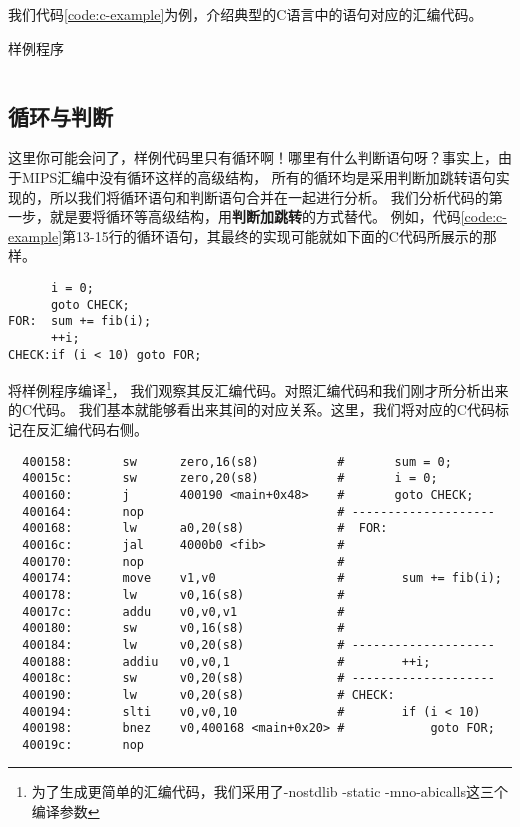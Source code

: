 我们代码\ref{code:c-example}为例，介绍典型的C语言中的语句对应的汇编代码。

\begin{codeBoxWithCaption}{样例程序\label{code:c-example}}
  \inputminted[linenos]{c}{codes/example.c}
\end{codeBoxWithCaption}

\subsection{循环与判断}
这里你可能会问了，样例代码里只有循环啊！哪里有什么判断语句呀？事实上，由于MIPS汇编中没有循环这样的高级结构，
所有的循环均是采用判断加跳转语句实现的，所以我们将循环语句和判断语句合并在一起进行分析。
我们分析代码的第一步，就是要将循环等高级结构，用\textbf{判断加跳转}的方式替代。
例如，代码\ref{code:c-example}第13-15行的循环语句，其最终的实现可能就如下面的C代码所展示的那样。

\begin{verbatim}
      i = 0;
      goto CHECK;
FOR:  sum += fib(i);
      ++i;
CHECK:if (i < 10) goto FOR;
\end{verbatim}

将样例程序编译\footnote{为了生成更简单的汇编代码，我们采用了-nostdlib -static -mno-abicalls这三个编译参数}，
我们观察其反汇编代码。对照汇编代码和我们刚才所分析出来的C代码。
我们基本就能够看出来其间的对应关系。这里，我们将对应的C代码标记在反汇编代码右侧。

\begin{verbatim}
  400158:       sw      zero,16(s8)           #       sum = 0;
  40015c:       sw      zero,20(s8)           #       i = 0;
  400160:       j       400190 <main+0x48>    #       goto CHECK;
  400164:       nop                           # --------------------
  400168:       lw      a0,20(s8)             #  FOR:
  40016c:       jal     4000b0 <fib>          #
  400170:       nop                           #
  400174:       move    v1,v0                 #        sum += fib(i);
  400178:       lw      v0,16(s8)             #
  40017c:       addu    v0,v0,v1              #
  400180:       sw      v0,16(s8)             #
  400184:       lw      v0,20(s8)             # --------------------
  400188:       addiu   v0,v0,1               #        ++i;
  40018c:       sw      v0,20(s8)             # --------------------
  400190:       lw      v0,20(s8)             # CHECK:
  400194:       slti    v0,v0,10              #        if (i < 10)
  400198:       bnez    v0,400168 <main+0x20> #            goto FOR;
  40019c:       nop
\end{verbatim}

